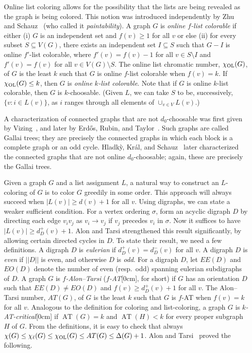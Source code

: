 \documentclass[12pt]{article}
\theoremstyle{plain}
\theoremstyle{definition}
\theoremstyle{remark}
\newcommand{\AT}{\operatorname{AT}}
\def\chil{{\chi_\ell}}
\def\chiol{\chi_{\rm{OL}}}
\newcommand{\aside}[1]{\marginnote{\scriptsize{#1}}[0cm]}
\begin{document}
Online list coloring allows for the possibility that the lists are being
revealed as the graph is being colored.  This notion was introduced 
independently by Zhu~\cite{zhu2009online} and Schauz~\cite{schauz2009mr} (who
called it \emph{paintability}).  A graph $G$ is \emph{online $f$-list
colorable} if either (i) $G$ is an independent
set and $f(v)\ge 1$ for all $v$ or else (ii) for every subset $S\subseteq V(G)$,
there exists an independent set $I\subseteq S$ such that $G-I$ is online
$f'$-list colorable, where $f'(v)=f(v)-1$ for all $v\in S\setminus I$ and
$f'(v)=f(v)$ for all $v\in V(G)\setminus S$.  The online list chromatic number, 
$\chiol(G)$, of $G$ is the least $k$ such that $G$ is online $f$-list colorable
when $f(v)=k$.  If $\chiol(G)\le k$, then $G$ is \emph{online $k$-list
colorable}.  Note that if $G$ is online $k$-list colorable, then $G$ is
$k$-choosable. (Given $L$, we can take $S$ to be, successively, 
$\{v:i\in L(v)\}$, as $i$ ranges through all elements of $\cup_{v\in V}L(v)$.)

A characterization of connected graphs that are not $d_0$-choosable was first
given by Vizing~\cite{vizing1976}, and later by Erd\H{o}s, Rubin, and
Taylor~\cite{erdos1979choosability}.  Such graphs are called Gallai trees;
they are precisely the connected graphs in which each block is a complete graph
or an odd cycle.  Hladk{\`y}, Kr{\'a}l, and Schauz~\cite{Hladky} later
characterized the connected
graphs that are not online $d_0$-choosable; again, these are precisely the
Gallai trees.

Given a graph $G$ and a list assignment $L$, a natural way to construct an
$L$-coloring of $G$ is to color $G$ greedily in some order.  This approach will
always succeed when $|L(v)|\ge d(v)+1$ for all $v$.  Using digraphs, we can
state a weaker sufficient condition.  For a vertex ordering $\sigma$, form an
acyclic digraph $D$ by directing each edge $v_iv_j$ as $v_i \to v_j$ if $v_j$
precedes $v_i$ in $\sigma$.  Now it suffices to have $|L(v)|\ge d^+_D(v)+1$. 
Alon and Tarsi strengthened this result significantly, by
allowing certain directed cycles in $D$.  To state their result, we need a few
definitions.  A digraph $D$ is \emph{eulerian} if $d^+_D(v)=d^-_D(v)$ for all
$v$.  A digraph $D$ is \emph{even} if $||D||$ is even, and otherwise $D$ is
\emph{odd}.  For a digraph $D$, let $EE(D)$ and $EO(D)$ denote the number of
even (resp.~odd) spanning eulerian subdigraphs of $D$.  A graph $G$ is
\emph{$f$-Alon--Tarsi} (\emph{$f$-AT}\aside{$f$-AT}, for short) if $G$ has an
orientation $D$ such that $EE(D)\ne EO(D)$ and $f(v)\ge d^+_D(v)+1$ for all
$v$.  The Alon--Tarsi number, $AT(G)$, of $G$ is the least $k$ such that $G$ is
$f$-AT when $f(v)=k$ for all $v$.  Analogous to the definition for coloring and
list-coloring, a graph $G$ is \emph{$k$-AT-critical}\aside{$k$-AT-critical} if
$\AT(G)=k$ and $\AT(H)<k$ for every proper subgraph $H$ of $G$.  From the
definitions, it is easy to check that always $\chi(G)\le \chil(G)\le
\chiol(G)\le AT(G)\le \Delta(G)+1$.
Alon and Tarsi~\cite{Alon1992125} proved the following.
 
\end{document}
